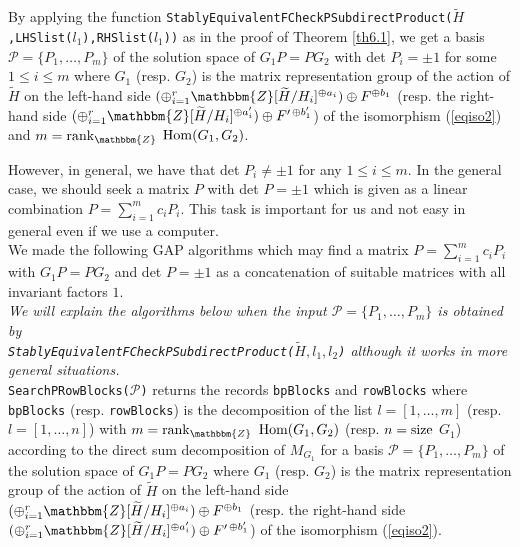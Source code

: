 \documentclass{amsart}
\theoremstyle{plain}
\theoremstyle{definition}
\theoremstyle{remark}
\newcommand{\bZ}{\mathbbm{Z}}\newcommand{\bQ}{\mathbbm{Q}}
\begin{document}
By applying the function 
{\tt StablyEquivalentFCheckPSubdirectProduct($\widetilde{H}$,LHSlist($l_1$),RHSlist($l_1$))} as in the proof of Theorem \ref{th6.1}, 
we get a basis $\mathcal{P}=\{P_1,\dots,P_m\}$ 
of the solution space of $G_1P=PG_2$ with det $P_i=\pm 1$ 
for some $1\leq i\leq m$ 
where $G_1$ (resp. $G_2$) is the matrix representation group of the action of 
$\widetilde{H}$ 
on the left-hand side $(\oplus_{i=1}^r \bZ[\widetilde{H}/H_i]^{\oplus a_i})\oplus F^{\oplus b_1}$ 
(resp. the right-hand side 
$(\oplus_{i=1}^r \bZ[\widetilde{H}/H_i]^{\oplus a_i^{\prime}})\oplus F^{\prime\,\oplus b_1^{\prime}}$) 
of the isomorphism (\ref{eqiso2}) 
and $m={\rm rank}_\bZ$ ${\rm Hom}(G_1,G_2)$. 

However, in general, we have that det $P_i\neq\pm 1$ for any $1\leq i\leq m$. 
In the general case, we should seek a matrix $P$ with det $P=\pm 1$ 
which is given as a linear combination $P=\sum_{i=1}^m c_i P_i$. 
This task is important for us 
and not easy in general even if we use a computer.\\

We made the following GAP \cite{GAP} algorithms which 
may find a matrix $P=\sum_{i=1}^m c_i P_i$ 
with $G_1P=PG_2$ and det $P=\pm 1$ as a concatenation 
of suitable matrices with all invariant factors $1$.\\

{\it We will explain the algorithms below 
when the input $\mathcal{P}=\{P_1,\dots,P_m\}$ is obtained by\\  
{\tt StablyEquivalentFCheckPSubdirectProduct($\widetilde{H},l_1,l_2$)} 
although it works in more general situations.}\\

\noindent 
{\tt SearchPRowBlocks($\mathcal{P}$)}
returns the records {\tt bpBlocks} and {\tt rowBlocks} 
where 
{\tt bpBlocks} (resp. {\tt rowBlocks}) is 
the decomposition of the list $l=[1,\ldots,m]$ (resp. $l=[1,\ldots,n]$) 
with $m={\rm rank}_\bZ$ ${\rm Hom}(G_1,G_2)$ (resp. $n={\rm size}$ $G_1$)
according to the direct sum decomposition of $M_{G_1}$
%
for a basis $\mathcal{P}=\{P_1,\dots,P_m\}$ 
of the solution space of $G_1P=PG_2$ 
where $G_1$ (resp. $G_2$) is the matrix representation group of the action of 
$\widetilde{H}$ 
on the left-hand side $(\oplus_{i=1}^r \bZ[\widetilde{H}/H_i]^{\oplus a_i})\oplus F^{\oplus b_1}$ 
(resp. the right-hand side 
$(\oplus_{i=1}^r \bZ[\widetilde{H}/H_i]^{\oplus a_i^{\prime}})\oplus F^{\prime\,\oplus b_1^{\prime}}$) 
of the isomorphism (\ref{eqiso2}).\\ 
\end{document}
